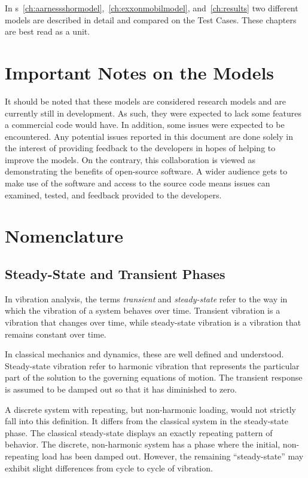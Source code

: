 In \chaptername{}s~\ref{ch:aarnessshormodel},~\ref{ch:exxonmobilmodel}, and~\ref{ch:results} two different models are described in detail and compared on the Test Cases.  These chapters are best read as a unit.

\section{Important Notes on the Models}
It should be noted that these models are considered research models and are currently still in development.  As such, they were expected to lack some features a commercial code would have.  In addition, some issues were expected to be encountered.  Any potential issues reported in this document are done solely in the interest of providing feedback to the developers in hopes of helping to improve the models.    On the contrary, this collaboration is viewed as demonstrating the benefits of open-source software.  A wider audience gets to make use of the software and access to the source code means issues can examined, tested, and feedback provided to the developers.


\section{Nomenclature}
\subsection{Steady-State and Transient Phases}
In vibration analysis, the terms \emph{transient} and \emph{steady-state} refer to the way in which the vibration of a system behaves over time.  Transient vibration is a vibration that changes over time, while steady-state vibration is a vibration that remains constant over time.

In classical mechanics and dynamics, these are well defined and understood.  Steady-state vibration refer to harmonic vibration that represents the particular part of the solution to the governing equations of motion.  The transient response is assumed to be damped out so that it has diminished to zero.

A discrete system with repeating, but non-harmonic loading, would not strictly fall into this definition.  It differs from the classical system in the steady-state phase.  The classical steady-state displays an exactly repeating pattern of behavior.  The discrete, non-harmonic system has a phase where the initial, non-repeating load has been damped out.  However, the remaining ``steady-state'' may exhibit slight differences from cycle to cycle of vibration.  

